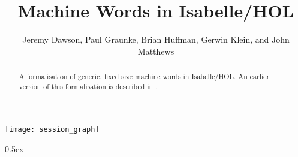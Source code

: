 \documentclass[11pt,a4paper]{article}
\begin{document}
\title{Machine Words in Isabelle/HOL}

\author{Jeremy Dawson, Paul Graunke, Brian Huffman, Gerwin Klein, and John Matthews}

\maketitle

\begin{abstract}
A formalisation of generic, fixed size machine words in Isabelle/HOL. An earlier version of this 
formalisation is described in \cite{dawson-avocs07}.  
\end{abstract}

\tableofcontents

\begin{center}
  \texttt{[image: session\_graph]}
\end{center}

\newpage

\renewcommand{\isamarkupheader}[1]%
{\section{\isabellecontext: #1}\markright{THEORY~``\isabellecontext''}}

\parindent 0pt\parskip 0.5ex




\end{document}
